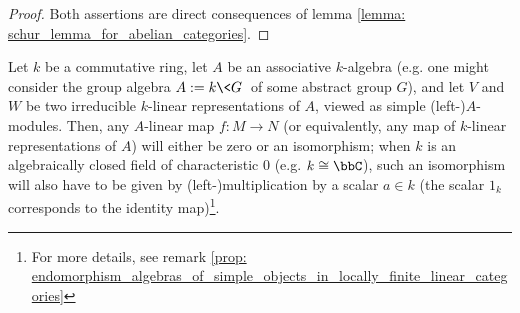                 \begin{proof}
                    Both assertions are direct consequences of lemma \ref{lemma: schur_lemma_for_abelian_categories}.
                \end{proof}
            \begin{example}
                Let $k$ be a commutative ring, let $A$ be an associative $k$-algebra (e.g. one might consider the group algebra $A := k\<G\>$ of some abstract group $G$), and let $V$ and $W$ be two irreducible $k$-linear representations of $A$, viewed as simple (left-)$A$-modules. Then, any $A$-linear map $f: M \to N$ (or equivalently, any map of $k$-linear representations of $A$) will either be zero or an isomorphism; when $k$ is an algebraically closed field of characteristic $0$ (e.g. $k \cong \bbC$), such an isomorphism will also have to be given by (left-)multiplication by a scalar $a \in k$ (the scalar $1_k$ corresponds to the identity map)\footnote{For more details, see remark \ref{prop: endomorphism_algebras_of_simple_objects_in_locally_finite_linear_categories}}.
            \end{example}
                
